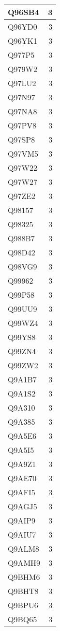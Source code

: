 \documentclass[
]{book}
\theoremstyle{definition}
\theoremstyle{definition}
\theoremstyle{definition}
\theoremstyle{definition}
\theoremstyle{remark}
\begin{document}
\begin{table}
\begin{tabular}{l|r}
\hline
Q96SB4 & 3\\
\hline
Q96YD0 & 3\\
\hline
Q96YK1 & 3\\
\hline
Q977P5 & 3\\
\hline
Q979W2 & 3\\
\hline
Q97LU2 & 3\\
\hline
Q97N97 & 3\\
\hline
Q97NA8 & 3\\
\hline
Q97PV8 & 3\\
\hline
Q97SP8 & 3\\
\hline
Q97VM5 & 3\\
\hline
Q97W22 & 3\\
\hline
Q97W27 & 3\\
\hline
Q97ZE2 & 3\\
\hline
Q98157 & 3\\
\hline
Q98325 & 3\\
\hline
Q988B7 & 3\\
\hline
Q98D42 & 3\\
\hline
Q98VG9 & 3\\
\hline
Q99962 & 3\\
\hline
Q99P58 & 3\\
\hline
Q99UU9 & 3\\
\hline
Q99WZ4 & 3\\
\hline
Q99YS8 & 3\\
\hline
Q99ZN4 & 3\\
\hline
Q99ZW2 & 3\\
\hline
Q9A1B7 & 3\\
\hline
Q9A1S2 & 3\\
\hline
Q9A310 & 3\\
\hline
Q9A385 & 3\\
\hline
Q9A5E6 & 3\\
\hline
Q9A5I5 & 3\\
\hline
Q9A9Z1 & 3\\
\hline
Q9AE70 & 3\\
\hline
Q9AFI5 & 3\\
\hline
Q9AGJ5 & 3\\
\hline
Q9AIP9 & 3\\
\hline
Q9AIU7 & 3\\
\hline
Q9ALM8 & 3\\
\hline
Q9AMH9 & 3\\
\hline
Q9BHM6 & 3\\
\hline
Q9BHT8 & 3\\
\hline
Q9BPU6 & 3\\
\hline
Q9BQ65 & 3\\

\end{tabular}
\end{table}
\end{document}
